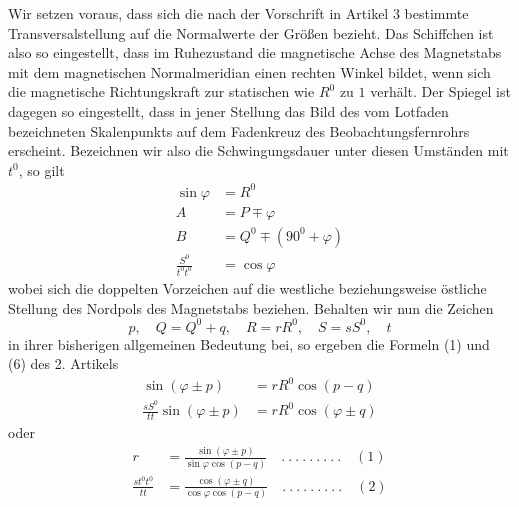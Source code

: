 Wir setzen voraus, dass sich die nach der Vorschrift in Artikel 3 bestimmte Transversalstellung auf die Normalwerte der Größen bezieht. Das Schiffchen ist also so eingestellt, dass im Ruhezustand die magnetische Achse des Magnetstabs mit dem magnetischen Normalmeridian einen rechten Winkel bildet, wenn sich die magnetische Richtungskraft zur statischen wie $R^0$ zu $1$ verhält. Der Spiegel ist dagegen so eingestellt, dass in jener Stellung das Bild des vom Lotfaden bezeichneten Skalenpunkts auf dem Fadenkreuz des Beobachtungsfernrohrs erscheint. Bezeichnen wir also die Schwingungsdauer unter diesen Umständen mit $t^0$, so gilt
\[
\begin{aligned}
\sin\varphi&=R^0\\
A&=P\mp\varphi\\
B&=Q^0\mp(90^0+\varphi)\\
\frac{S^0}{t^0t^0}&=\cos\varphi
\end{aligned}
\]
wobei sich die doppelten Vorzeichen auf die westliche beziehungsweise östliche Stellung des Nordpols des Magnetstabs beziehen. Behalten wir nun die Zeichen
\[
p,\quad Q=Q^0+q,\quad R=rR^0,\quad S=sS^0,\quad t
\]
in ihrer bisherigen allgemeinen Bedeutung bei, so ergeben die Formeln (1) und (6) des 2. Artikels
\[
\begin{aligned}
\sin(\varphi\pm p)&=rR^0\cos(p-q)\\
\frac{sS^0}{tt}\sin(\varphi\pm p)&=rR^0\cos(\varphi\pm q)
\end{aligned}
\]
oder
\[
\begin{aligned}
r&=\frac{\sin(\varphi\pm p)}{\sin\varphi\cos(p-q)}\quad .\ .\ .\ .\ .\ .\ .\ .\ .\quad(1)\\
\frac{st^0t^0}{tt}&=\frac{\cos(\varphi\pm q)}{\cos\varphi\cos(p-q)}\quad .\ .\ .\ .\ .\ .\ .\ .\ .\quad(2)
\end{aligned}
\]

